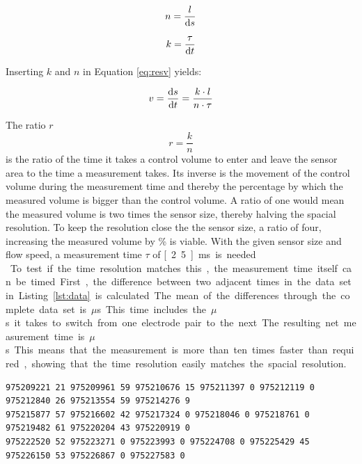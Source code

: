 \begin{equation}
	n = \dfrac{l}{\mathop{}\!\mathrm{d} s}
\label{eq:resn} 
\end{equation}

\begin{equation}
	k = \dfrac{ \tau}{\mathop{}\!\mathrm{d} t}
\label{eq:resk}
\end{equation}

Inserting $ k $ and $ n $ in Equation \eqref{eq:resv} yields:

\begin{equation}
	v = \dfrac{\mathop{}\!\mathrm{d} s}{\mathop{}\!\mathrm{d} t} = \dfrac{k \cdot l}{n \cdot \tau}
\label{eq:resv1} 
\end{equation}

The ratio $ r $
\begin{equation}
	r = \frac{k}{n}
\label{eq:resr} 
\end{equation}
is the ratio of the time it takes a control volume to enter and leave the sensor area  to the time a measurement takes. Its inverse is the movement of the control volume during the measurement time and thereby the percentage by which the measured volume is bigger than the control volume. A ratio of one would mean the measured volume is two times the sensor size, thereby halving the spacial resolution. To keep the resolution close the the sensor size, a ratio of four, increasing the measured volume by \unit[25]{\%} is viable.
With the given sensor size and flow speed, a measurement time $ \tau $ of \unit[2.5]{ms} is needed.\\

To test if the time resolution matches this, the measurement time itself can be timed. First, the difference between two adjacent times in the data set in Listing \ref{lst:data} is calculated. The mean of the differences through the complete data set is \unit[748]{$\mu$s}. This time includes the \unit[520]{$\mu$s} it takes to switch from one electrode pair to the next. The resulting net measurement time is \unit[228]{$\mu$s}. This means that the measurement is more than ten times faster than required, showing that the time resolution easily matches the spacial resolution.

\begin{lstlisting}[caption={An excerpt of measurement data showing three lines of data from eight sensors. The long numbers are the times at which the measurements were taken in microseconds measured from the start, the short numbers are the measured values.},label={lst:data}]
975209221 21 975209961 59 975210676 15 975211397 0 975212119 0 975212840 26 975213554 59 975214276 9 
975215877 57 975216602 42 975217324 0 975218046 0 975218761 0 975219482 61 975220204 43 975220919 0 
975222520 52 975223271 0 975223993 0 975224708 0 975225429 45 975226150 53 975226867 0 975227583 0  
\end{lstlisting}

